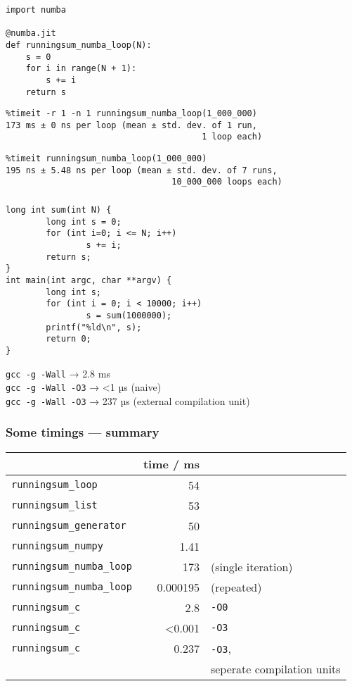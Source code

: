 \documentclass[serif]{beamer}
\begin{document}
\begin{frame}[fragile,t]
  \frametitle{\phantom{S}}
  \begin{verbatim}
import numba

@numba.jit
def runningsum_numba_loop(N):
    s = 0
    for i in range(N + 1):
        s += i
    return s
  \end{verbatim}
  \pause
  \begin{verbatim}
%timeit -r 1 -n 1 runningsum_numba_loop(1_000_000)
173 ms ± 0 ns per loop (mean ± std. dev. of 1 run,
                                       1 loop each)
  \end{verbatim}
  \pause
  \begin{verbatim}
%timeit runningsum_numba_loop(1_000_000)
195 ns ± 5.48 ns per loop (mean ± std. dev. of 7 runs,
                                 10_000_000 loops each)
  \end{verbatim}
\end{frame}

\begin{frame}[fragile,t]
  \frametitle{\phantom{S}}
  \begin{verbatim}
long int sum(int N) {
        long int s = 0;
        for (int i=0; i <= N; i++)
                s += i;
        return s;
}
int main(int argc, char **argv) {
        long int s;
        for (int i = 0; i < 10000; i++)
                s = sum(1000000);
        printf("%ld\n", s);
        return 0;
}
  \end{verbatim}
  \texttt{gcc -g -Wall} → 2.8 ms\\
  \texttt{gcc -g -Wall -O3} → \textless 1 µs (naive)\\
  \texttt{gcc -g -Wall -O3} → 237 µs (external compilation unit)
\end{frame}

\begin{frame}[fragile]
  \frametitle{Some timings — summary}

  \begin{tabular}{lrl}
    & time / ms\hspace{-0.5cm} \\
    \hline
    \texttt{runningsum\_loop} &    54 \\
    \texttt{runningsum\_list} &      53 \\
    \texttt{runningsum\_generator} &    50 \\
    \texttt{runningsum\_numpy} &   1.41 \\
    \texttt{runningsum\_numba\_loop} & 173 & (single iteration)\\
    \texttt{runningsum\_numba\_loop} & 0.000195 & (repeated) \\
    \texttt{runningsum\_c} & 2.8        & \texttt{-O0} \\
    \texttt{runningsum\_c} & \textless 0.001 & \texttt{-O3} \\
    \texttt{runningsum\_c} & 0.237 & \texttt{-O3},\\
    & & seperate compilation units
  \end{tabular}
\end{frame}
\end{document}
